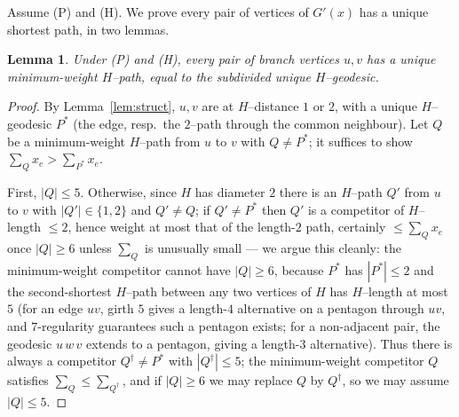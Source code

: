 \documentclass{amsart}
\newtheorem{lemma}{Lemma}
\theoremstyle{definition}
\begin{document}
Assume (P) and (H). We prove every pair of vertices of $G'(x)$ has a unique
shortest path, in two lemmas.

\begin{lemma}\label{lem:branchunique}
Under \textnormal{(P)} and \textnormal{(H)}, every pair of branch vertices
$u,v$ has a unique minimum-weight $H$--path, equal to the subdivided unique
$H$--geodesic.
\end{lemma}

\begin{proof}
By Lemma~\ref{lem:struct}, $u,v$ are at $H$--distance $1$ or $2$, with a unique
$H$--geodesic $P^\ast$ (the edge, resp.\ the $2$--path through the common
neighbour). Let $Q$ be a minimum-weight $H$--path from $u$ to $v$ with
$Q\ne P^\ast$; it suffices to show $\sum_Q x_e>\sum_{P^\ast}x_e$.

First, $|Q|\le 5$. Otherwise, since $H$ has diameter $2$ there is an $H$--path
$Q'$ from $u$ to $v$ with $|Q'|\in\{1,2\}$ and $Q'\ne Q$; if $Q'\ne P^\ast$ then
$Q'$ is a competitor of $H$--length $\le2$, hence weight at most that of the
length-$2$ path, certainly $\le \sum_Q x_e$ once $|Q|\ge6$ unless $\sum_Q$ is
unusually small --- we argue this cleanly: the minimum-weight competitor cannot
have $|Q|\ge6$, because $P^\ast$ has $|P^\ast|\le2$ and the second-shortest
$H$--path between any two vertices of $H$ has $H$--length at most $5$ (for an
edge $uv$, girth $5$ gives a length-$4$ alternative on a pentagon through $uv$,
and $7$-regularity guarantees such a pentagon exists; for a non-adjacent pair,
the geodesic $u\,w\,v$ extends to a pentagon, giving a length-$3$ alternative).
Thus there is always a competitor $Q^{\dagger}\ne P^\ast$ with $|Q^{\dagger}|\le
5$; the minimum-weight competitor $Q$ satisfies $\sum_Q\le\sum_{Q^\dagger}$, and
if $|Q|\ge6$ we may replace $Q$ by $Q^\dagger$, so we may assume $|Q|\le5$.


\end{proof}
\end{document}
